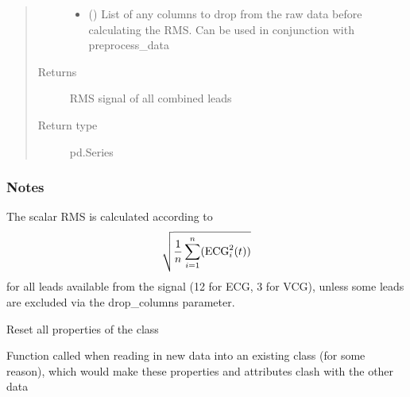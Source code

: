 \documentclass[letterpaper,10pt,english]{sphinxmanual}
\begin{document}
\begin{fulllineitems}
\begin{fulllineitems}
\begin{quote}
\begin{description}
\begin{itemize}
\item {} 
\sphinxAtStartPar
{} (\sphinxstyleliteralemphasis{\sphinxupquote{, }}) \textendash{} List of any columns to drop from the raw data before calculating the RMS. Can be used in conjunction with
preprocess\_data

\end{itemize}

\item[{Returns}] \leavevmode
\sphinxAtStartPar
{} \textendash{} RMS signal of all combined leads

\item[{Return type}] \leavevmode
\sphinxAtStartPar
pd.Series

\end{description}\end{quote}
\subsubsection*{Notes}

\sphinxAtStartPar
The scalar RMS is calculated according to
\begin{equation*}
\begin{split}\sqrt{ \frac{1}{n}\sum_{i=1}^n (\textnormal{ECG}_i^2(t)) }\end{split}
\end{equation*}
\sphinxAtStartPar
for all leads available from the signal (12 for ECG, 3 for VCG), unless some leads are excluded via the
drop\_columns parameter.

\end{fulllineitems}


\begin{fulllineitems}
\label{\detokenize{_autosummary/signalanalysis.vcg.Vcg:signalanalysis.vcg.Vcg.reset}}
\sphinxAtStartPar
Reset all properties of the class

\sphinxAtStartPar
Function called when reading in new data into an existing class (for some reason), which would make these
properties and attributes clash with the other data

\end{fulllineitems}


\end{fulllineitems}
\end{document}
